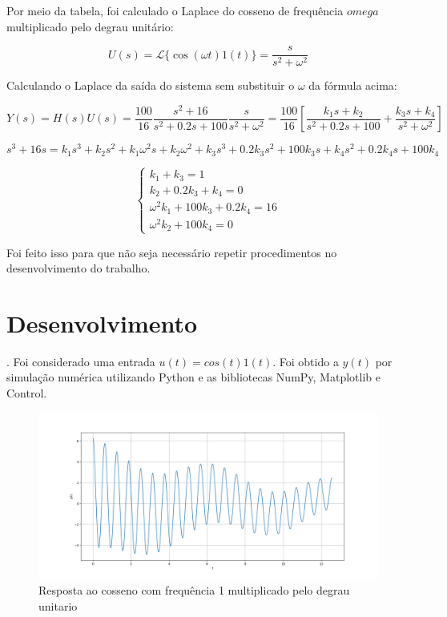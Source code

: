 \documentclass[10pt]{article}
\begin{document}
\quad Por meio da tabela, foi calculado o Laplace do cosseno de frequência $omega$ multiplicado pelo degrau unitário:

\begin{equation}
    U(s) = \mathcal{L}\{ \cos(\omega t) 1(t) \} = \frac{s}{s^2 + \omega^2}
\end{equation}

\quad Calculando o Laplace da saída do sistema sem substituir o $\omega$ da fórmula acima:

\begin{equation}
    Y(s) = H(s)U(s) = \frac{100}{16} \frac{s^2 + 16}{s^2 + 0.2s + 100} \frac{s}{s^2 + \omega^2} = \frac{100}{16} \left[ \frac{k_1s + k_2}{s^2 + 0.2s + 100} + \frac{k_3s + k_4}{s^2 + \omega^2} \right] 
\end{equation}

\begin{equation}
    s^3 + 16s = k_1s^3 + k_2s^2 + k_1\omega^2 s + k_2\omega^2 + k_3s^3 + 0.2k_3s^2 + 100k_3s + k_4s^2 + 0.2k_4s + 100k_4
\end{equation}

\begin{equation}
    \left\{
    \begin{array}{l}
        k_1 + k_3 = 1 \\
        k_2 + 0.2k_3 +k_4 = 0 \\
        \omega^2k_1 + 100k_3 + 0.2k_4 = 16 \\
        \omega^2k_2 + 100k_4 = 0
    \end{array}
    \right. 
\end{equation}

\quad Foi feito isso para que não seja necessário repetir procedimentos no desenvolvimento do trabalho.

\newpage

\section{Desenvolvimento}

. Foi considerado uma entrada $u(t) = cos(t) 1(t)$. Foi obtido a $y(t)$ por simulação numérica utilizando Python
e as bibliotecas NumPy, Matplotlib e Control.

\begin{figure}[h]
    \centering
    \includegraphics[scale=0.45]{questao1.png}
    \caption{Resposta ao cosseno com frequência 1 multiplicado pelo degrau unitario}
\end{figure}
\end{document}
